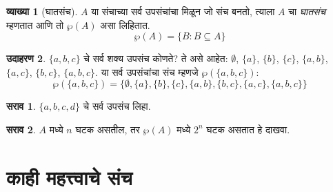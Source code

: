 \documentclass[11pt,a4paper,openany]{book}
\theoremstyle{definition}
\newtheorem{defn}{व्याख्या}[section]
\newtheorem{ex}[defn]{उदाहरण}
\newtheorem{prob}{सराव}[chapter]
\newcommand{\Setabs}[2]{\{#1:#2\}}
\newcommand{\Pow}[1]{\wp(#1)}
\begin{document}
\begin{defn}[घातसंच]
$A$ या संचाच्या सर्व उपसंचांचा मिळून जो संच बनतो, त्याला
$A$ चा \emph{घातसंच} म्हणतात आणि तो $\Pow{A}$ असा लिहितात.
  \[
    \Pow{A} = \Setabs{B}{B \subseteq A}
  \]
\end{defn}

\begin{ex}
$\{ a, b, c \}$ चे सर्व शक्य उपसंच कोणते? ते असे आहेत:
$\emptyset$, $\{a \}$, $\{b\}$, $\{c\}$, $\{a, b\}$, $\{a, c\}$, $\{b,
c\}$, $\{a, b, c\}$. या सर्व उपसंचांचा संच म्हणजे
$\Pow{\{a,b,c\}}$:
\[
\Pow{\{ a, b, c \}} = \{\emptyset, \{a \}, \{b\}, \{c\}, \{a, b\},
\{b, c\}, \{a, c\}, \{a, b, c\}\}
\]
\end{ex}

\begin{prob}
$\{a, b, c, d\}$ चे सर्व उपसंच लिहा.
\end{prob}

\begin{prob}
$A$ मध्ये $n$ घटक असतील, तर $\Pow{A}$ मध्ये $2^n$
घटक असतात हे दाखवा.
\end{prob}











\section{काही महत्त्वाचे संच}\label{sfr:set:imp:sec}
\end{document}
